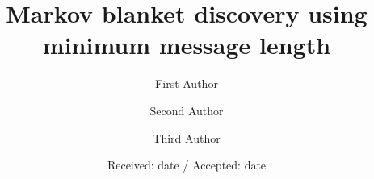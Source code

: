 \makeatletter
\newcommand*{\centernot}{%
  \mathpalette\@centernot
}
\def\@centernot#1#2{%
  \mathrel{%
    \rlap{%
      \settowidth\dimen@{$\m@th#1{#2}$}%
      \kern.5\dimen@
      \settowidth\dimen@{$\m@th#1=$}%
      \kern-.5\dimen@
      $\m@th#1\not$%
    }%
    {#2}%
  }%
}
\makeatother

%
%



\title{Markov blanket discovery using minimum message length%
}


\author{First Author         \and
        Second Author \and
        Third Author
}



\date{Received: date / Accepted: date}

\maketitle

